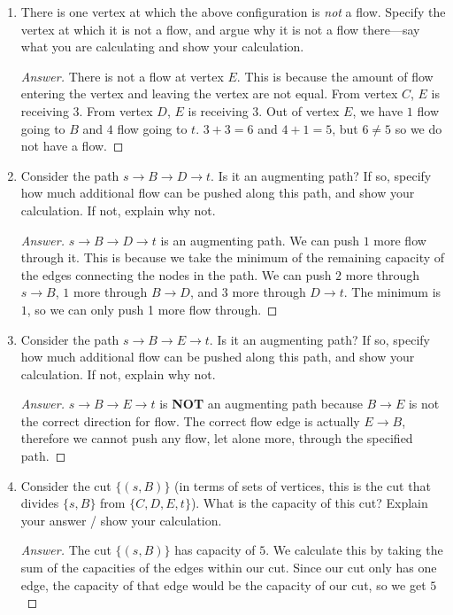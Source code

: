 \documentclass[11pt]{article}
\theoremstyle{definition}
\theoremstyle{definition}
\theoremstyle{definition}
\begin{document}
\renewcommand{\theenumi}{\alph{enumi}}
\begin{enumerate}
\item There is one vertex at which the above configuration is \emph{not} a flow. Specify the vertex at which it is not a flow, and argue why it is not a flow there---say what you are calculating and show your calculation.

\begin{proof}[Answer]
There is not a flow at vertex $E$. This is because the amount of flow entering the vertex and leaving the vertex are not equal. From vertex $C$, $E$ is receiving $3$. From vertex $D$, $E$ is receiving $3$. Out of vertex $E$, we have $1$ flow going to $B$ and $4$ flow going to $t$. $3 + 3 = 6$ and $4 + 1 = 5$, but $6 \ne 5$ so we do not have a flow.
\end{proof}

\vfill
\item Consider the path $s \to B \to D \to t$. Is it an augmenting path? If so, specify how much additional flow can be pushed along this path, and show your calculation. If not, explain why not.

\begin{proof}[Answer]
$s \to B \to D \to t$ is an augmenting path. We can push $1$ more flow through it. This is because we take the minimum of the remaining capacity of the edges connecting the nodes in the path. We can push $2$ more through $s \to B$, $1$ more through $B \to D$, and $3$ more through $D \to t$. The minimum is $1$, so we can only push 1 more flow through.
\end{proof}

\vfill
\newpage 

\item Consider the path $s \to B \to E \to t$. Is it an augmenting path? If so, specify how much additional flow can be pushed along this path, and show your calculation. If not, explain why not.

\begin{proof}[Answer]
$s \to B \to E \to t$ is \textbf{NOT} an augmenting path because $B \to E$ is not the correct direction for flow. The correct flow edge is actually $E \to B$, therefore we cannot push any flow, let alone more, through the specified path.
\end{proof}

\vfill
\item Consider the cut $\{(s, B)\}$ (in terms of sets of vertices, this is the cut that divides $\{s, B\}$ from $\{C,D,E,t\}$). What is the capacity of this cut? Explain your answer / show your calculation.

\begin{proof}[Answer]
The cut $\{(s, B)\}$ has capacity of $5$. We calculate this by taking the sum of the capacities of the edges within our cut. Since our cut only has one edge, the capacity of that edge would be the capacity of our cut, so we get $5$
\end{proof}
\vfill

\end{enumerate}


\end{document}
